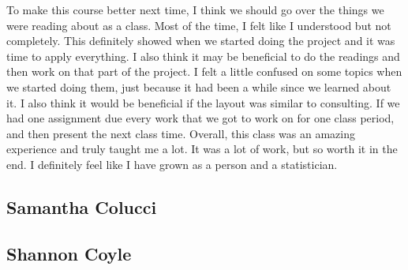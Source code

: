 \documentclass[12pt, letterpaper]{article}
\begin{document}
To make this course better next time, I think we should go over the things we were reading about as a class. Most of the time, I felt like I understood but not completely. This definitely showed when we started doing the project and it was time to apply everything. I also think it may be beneficial to do the readings and then work on that part  of the project. I felt a little confused on some topics when we started doing them, just because it had been a while since we learned about it. I also think it would be beneficial if the layout was similar to consulting. If we had one assignment due every work that we got to work on for one class period, and then present the next class time. Overall, this class was an amazing experience and truly taught me a lot. It was a lot of work, but so worth it in the end. I definitely feel like I have grown as a person and a statistician.
\subsection{Samantha Colucci}
\subsection{Shannon Coyle}
\end{document}
